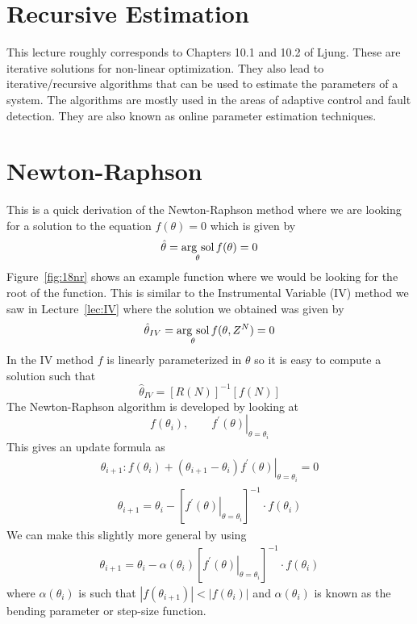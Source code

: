 \mainmatter%
\setcounter{page}{1}

\lectureseries[\course]{\course}

\date{December 1, 2009}

\setaddress%

\setcounter{lecture}{17}
\setcounter{chapter}{17}


\section{Recursive Estimation}
This lecture roughly corresponds to Chapters 10.1 and 10.2 of Ljung.
These are iterative solutions for non-linear optimization.
They also lead to iterative/recursive algorithms that can be used to estimate the parameters of a system.
The algorithms are mostly used in the areas of adaptive control and fault detection.
They are also known as online parameter estimation techniques.

\section{Newton-Raphson}
This is a quick derivation of the Newton-Raphson method where we are looking for a solution to the equation $f(\theta)=0$ which is given by
$$\hat{\theta} = \mathop{\arg\,\text{sol}}\limits_\theta f(\theta) = 0$$
Figure~\ref{fig:18nr} shows an example function where we would be looking for the root of the function.
This is similar to the Instrumental Variable (IV) method we saw in Lecture~\ref{lec:IV} where the solution we obtained was given by
$$\hat{\theta}_{IV} = \mathop{\arg\,\text{sol}}\limits_\theta f(\theta,Z^N) = 0$$
In the IV method $f$ is linearly parameterized in $\theta$ so it is easy to compute a solution such that
$$\hat{\theta}_{IV} = {[R(N)]}^{-1}[f(N)]$$
The Newton-Raphson algorithm is developed by looking at
$$f(\theta_i), \qquad \left.f^\prime(\theta)\right|_{\theta=\theta_i}$$
This gives an update formula as
\begin{align*}
\theta_{i+1}: f(\theta_i) + (\theta_{i+1}-\theta_i)\left.f^\prime(\theta)\right|_{\theta=\theta_i} = 0
\end{align*}
\begin{align*}
\boxed{\theta_{i+1} = \theta_i - {\left[\left.f^\prime(\theta)\right|_{\theta=\theta_i}\right]}^{-1}\cdot f(\theta_i)}
\end{align*}
We can make this slightly more general by using
\begin{align*}
\boxed{\theta_{i+1} = \theta_i - \alpha(\theta_i){\left[\left.f^\prime(\theta)\right|_{\theta=\theta_i}\right]}^{-1}\cdot f(\theta_i)}
\end{align*}
where $\alpha(\theta_i)$ is such that $|f(\theta_{i+1})|<|f(\theta_i)|$ and $\alpha(\theta_i)$ is known as the bending parameter or step-size function.

